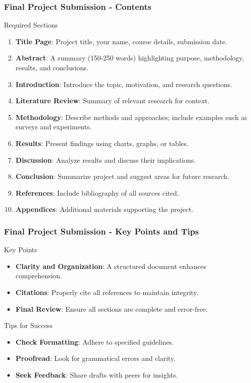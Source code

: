 \documentclass[aspectratio=169]{beamer}
\begin{document}
\begin{frame}[fragile]
  \frametitle{Final Project Submission - Contents}
  \begin{block}{Required Sections}
    \begin{enumerate}
      \item \textbf{Title Page}: Project title, your name, course details, submission date.
      \item \textbf{Abstract}: A summary (150-250 words) highlighting purpose, methodology, results, and conclusions.
      \item \textbf{Introduction}: Introduce the topic, motivation, and research questions.
      \item \textbf{Literature Review}: Summary of relevant research for context.
      \item \textbf{Methodology}: Describe methods and approaches; include examples such as surveys and experiments.
      \item \textbf{Results}: Present findings using charts, graphs, or tables.
      \item \textbf{Discussion}: Analyze results and discuss their implications.
      \item \textbf{Conclusion}: Summarize project and suggest areas for future research.
      \item \textbf{References}: Include bibliography of all sources cited.
      \item \textbf{Appendices}: Additional materials supporting the project.
    \end{enumerate}
  \end{block}
\end{frame}

\begin{frame}[fragile]
  \frametitle{Final Project Submission - Key Points and Tips}
  \begin{block}{Key Points}
    \begin{itemize}
      \item \textbf{Clarity and Organization}: A structured document enhances comprehension.
      \item \textbf{Citations}: Properly cite all references to maintain integrity.
      \item \textbf{Final Review}: Ensure all sections are complete and error-free.
    \end{itemize}
  \end{block}
  
  \begin{block}{Tips for Success}
    \begin{itemize}
      \item \textbf{Check Formatting}: Adhere to specified guidelines.
      \item \textbf{Proofread}: Look for grammatical errors and clarity.
      \item \textbf{Seek Feedback}: Share drafts with peers for insights.
    \end{itemize}
  \end{block}
\end{frame}
\end{document}
